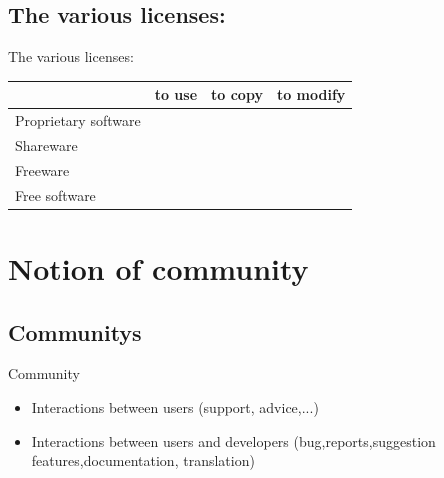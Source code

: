 \documentclass[11pt,hyperref={pdfpagemode=FullScreen}]{beamer}
\begin{document}
\subsection{The various licenses:}
\begin{frame}{The various licenses:}
\begin{center}
 \begin{tabular}{|l|c|c|c|}
\cline{2-4}
\multicolumn{1}{c|}{}  &to use &to copy &to modify \\ \hline    
 Proprietary software  &\cellcolor{yellow}&\cellcolor{red}&\cellcolor{red}\\ \hline 
 Shareware             &\cellcolor{green}&\cellcolor{red} &\cellcolor{red}\\ \hline 
 Freeware              &\cellcolor{green}&\cellcolor{green}&\cellcolor{red}\\ \hline 
 Free software         & \cellcolor{green}&\cellcolor{green}&  \cellcolor{green}\\ \hline
 
  \end{tabular}
\end{center} 
\end{frame}

\section{Notion of community}
\subsection{Communitys}
\begin{frame}{Community}
\begin{itemize}
 \pause \item \alert{Interactions} between users (support, advice,...)\newline
 \pause \item \alert{Interactions} between users and developers (bug,reports,suggestion features,documentation, translation)
\end{itemize}


\end{frame}

\end{document}
